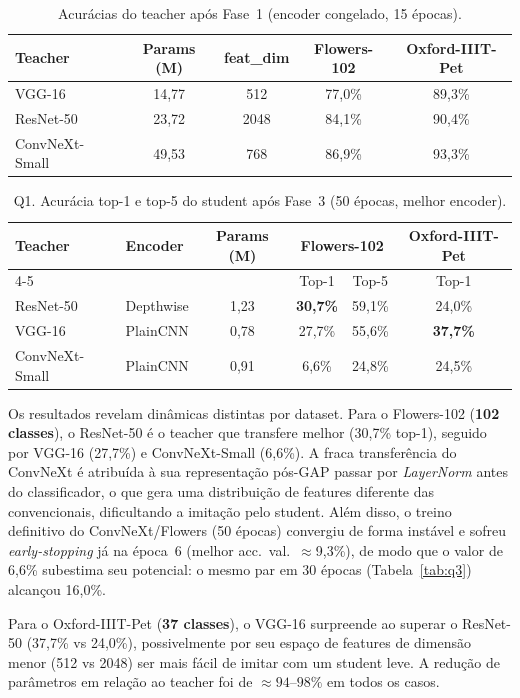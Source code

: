 \documentclass[
  article,            %
  11pt,               %
  letterpaper,        %
  oneside,            %
  sumario = tradicional
]{abntex2}
\begin{document}
\begin{table}[htb]
\centering
\caption{Acurácias do teacher após Fase~1 (encoder congelado, 15 épocas).}
\label{tab:fase1}
\begin{tabular}{@{}lcccc@{}}
\toprule
Teacher & Params (M) & feat\_dim & Flowers-102 & Oxford-IIIT-Pet \\ \midrule
VGG-16          & 14,77 & 512  & 77,0\% & 89,3\% \\
ResNet-50       & 23,72 & 2048 & 84,1\% & 90,4\% \\
ConvNeXt-Small  & 49,53 & 768  & 86,9\% & 93,3\% \\ \bottomrule
\end{tabular}
\end{table}

\begin{table}[htb]
\centering
\caption{Q1. Acurácia top-1 e top-5 do student após Fase~3 (50 épocas, melhor encoder).}
\label{tab:q1}
\begin{tabular}{@{}llcccc@{}}
\toprule
Teacher & Encoder & Params (M) & \multicolumn{2}{c}{Flowers-102} & Oxford-IIIT-Pet \\
\cmidrule(lr){4-5}
& & & Top-1 & Top-5 & Top-1 \\ \midrule
ResNet-50       & Depthwise  & 1,23 & \textbf{30,7\%} & 59,1\% & 24,0\% \\
VGG-16          & PlainCNN   & 0,78 & 27,7\%          & 55,6\% & \textbf{37,7\%} \\
ConvNeXt-Small  & PlainCNN   & 0,91 & 6,6\%           & 24,8\% & 24,5\% \\ \bottomrule
\end{tabular}
\end{table}

Os resultados revelam dinâmicas distintas por dataset. Para o Flowers-102
(\textbf{102 classes}), o ResNet-50 é o teacher que transfere melhor (30,7\%
top-1), seguido por VGG-16 (27,7\%) e ConvNeXt-Small (6,6\%). A fraca
transferência do ConvNeXt é atribuída à sua representação pós-GAP passar por
\textit{LayerNorm} antes do classificador, o que gera uma distribuição de
features diferente das convencionais, dificultando a imitação pelo student.
Além disso, o treino definitivo do ConvNeXt/Flowers (50 épocas) convergiu de forma
instável e sofreu \textit{early-stopping} já na época~6 (melhor acc.\ val.\
$\approx$9,3\%), de modo que o valor de 6,6\% subestima seu potencial: o mesmo
par em 30 épocas (Tabela~\ref{tab:q3}) alcançou 16,0\%.

Para o Oxford-IIIT-Pet (\textbf{37 classes}), o VGG-16 surpreende ao
superar o ResNet-50 (37,7\% vs 24,0\%), possivelmente por seu espaço de
features de dimensão menor (512 vs 2048) ser mais fácil de imitar com um
student leve. A redução de parâmetros em relação ao teacher foi de
$\approx 94$--$98\%$ em todos os casos.
\end{document}
